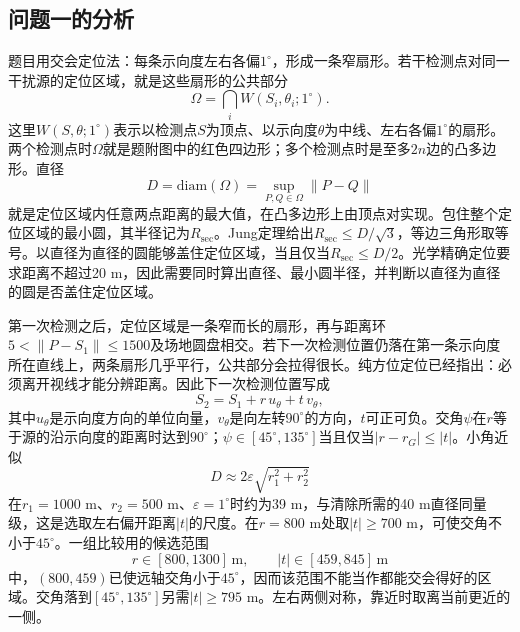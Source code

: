 \documentclass{cumcmthesis}
\begin{document}
\subsection{问题一的分析}

题目用交会定位法：每条示向度左右各偏$1^\circ$，形成一条窄扇形。若干检测点对同一干扰源的定位区域，就是这些扇形的公共部分
\begin{equation}
\Omega=\bigcap_i W(S_i,\theta_i;1^\circ).
\label{eq:omega}
\end{equation}
这里$W(S,\theta;1^\circ)$表示以检测点$S$为顶点、以示向度$\theta$为中线、左右各偏$1^\circ$的扇形。两个检测点时$\Omega$就是题附图中的红色四边形；多个检测点时是至多$2n$边的凸多边形。直径
\begin{equation}
D=\mathrm{diam}(\Omega)=\sup_{P,Q\in\Omega}\|P-Q\|
\label{eq:diam}
\end{equation}
就是定位区域内任意两点距离的最大值，在凸多边形上由顶点对实现\cite{toussaint1983}。包住整个定位区域的最小圆，其半径记为$R_{\mathrm{sec}}$。Jung定理给出$R_{\mathrm{sec}}\le D/\sqrt{3}$，等边三角形取等号\cite{jung1901}。以直径为直径的圆能够盖住定位区域，当且仅当$R_{\mathrm{sec}}\le D/2$。光学精确定位要求距离不超过20 m，因此需要同时算出直径、最小圆半径，并判断以直径为直径的圆是否盖住定位区域。

第一次检测之后，定位区域是一条窄而长的扇形，再与距离环$5<\|P-S_1\|\le 1500$及场地圆盘相交。若下一次检测位置仍落在第一条示向度所在直线上，两条扇形几乎平行，公共部分会拉得很长。纯方位定位已经指出：必须离开视线才能分辨距离\cite{nardone1984}。因此下一次检测位置写成
\begin{equation}
S_2=S_1+r\,u_{\theta}+t\,v_{\theta},
\label{eq:s2}
\end{equation}
其中$u_{\theta}$是示向度方向的单位向量，$v_{\theta}$是向左转$90^\circ$的方向，$t$可正可负。交角$\psi$在$r$等于源的沿示向度的距离时达到$90^\circ$；$\psi\in[45^\circ,135^\circ]$当且仅当$|r-r_G|\le|t|$。小角近似
\begin{equation}
D\approx 2\varepsilon\sqrt{r_1^2+r_2^2}
\label{eq:smallang}
\end{equation}
在$r_1=1000$ m、$r_2=500$ m、$\varepsilon=1^\circ$时约为39 m，与清除所需的40 m直径同量级，这是选取左右偏开距离$|t|$的尺度。在$r=800$ m处取$|t|\ge 700$ m，可使交角不小于$45^\circ$。一组比较用的候选范围
\[
r\in[800,1300]\,\mathrm{m},\qquad |t|\in[459,845]\,\mathrm{m}
\]
中，$(800,459)$已使远轴交角小于$45^\circ$，因而该范围不能当作都能交会得好的区域。交角落到$[45^\circ,135^\circ]$另需$|t|\ge 795$ m。左右两侧对称，靠近时取离当前更近的一侧。
\end{document}
